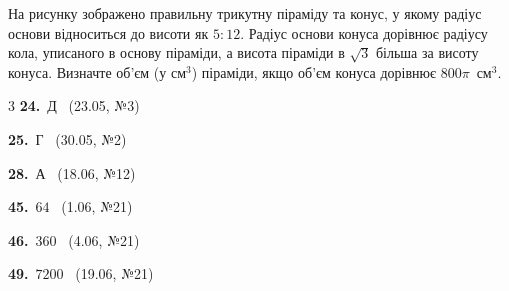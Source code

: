 \documentclass[12pt]{article}
\begin{document}
\begin{samepage}
\noindent
\begin{minipage}[c]{0.56\textwidth}
\zadnum На рисунку зображено правильну трикутну піраміду та конус, у якому радіус основи відноситься до висоти як $5 : 12$. Радіус основи конуса дорівнює радіусу кола, уписаного в основу піраміди, а висота піраміди в $\sqrt{3}$ більша за висоту конуса. Визначте об'єм (у см$^3$) піраміди, якщо об'єм конуса дорівнює $800\pi$~см$^3$. 
\end{minipage}%
\hfill
\begin{minipage}[c]{0.40\textwidth}
\centering
\begin{nmtfit}\end{nmtfit}
\end{minipage}
\par\nbvspace{0.2cm}
\nmtAnswerBox
\par{}
\end{samepage}

\ifshowsolutions
{}
\begin{multicols}{3}\noindent
\noindent\textbf{24.}~Д \ {\scriptsize\color{gray}(23.05, №3)}\par
\noindent\textbf{25.}~Г \ {\scriptsize\color{gray}(30.05, №2)}\par
\noindent\textbf{28.}~А \ {\scriptsize\color{gray}(18.06, №12)}\par
\noindent\textbf{45.}~$64$ \ {\scriptsize\color{gray}(1.06, №21)}\par
\noindent\textbf{46.}~$360$ \ {\scriptsize\color{gray}(4.06, №21)}\par
\noindent\textbf{49.}~$7200$ \ {\scriptsize\color{gray}(19.06, №21)}\par
\end{multicols}
\fi

\endgroup
\end{document}
